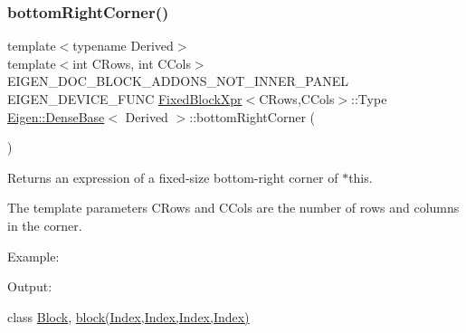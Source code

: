 \subsubsection{\texorpdfstring{bottomRightCorner()}{bottomRightCorner()}\hspace{0.1cm}{\footnotesize\ttfamily [2/3]}}
{\footnotesize\ttfamily template$<$typename Derived$>$ \\
template$<$int C\+Rows, int C\+Cols$>$ \\
E\+I\+G\+E\+N\+\_\+\+D\+O\+C\+\_\+\+B\+L\+O\+C\+K\+\_\+\+A\+D\+D\+O\+N\+S\+\_\+\+N\+O\+T\+\_\+\+I\+N\+N\+E\+R\+\_\+\+P\+A\+N\+EL E\+I\+G\+E\+N\+\_\+\+D\+E\+V\+I\+C\+E\+\_\+\+F\+U\+NC \mbox{\hyperlink{struct_eigen_1_1_dense_base_1_1_fixed_block_xpr}{Fixed\+Block\+Xpr}}$<$C\+Rows,C\+Cols$>$\+::Type \mbox{\hyperlink{class_eigen_1_1_dense_base}{Eigen\+::\+Dense\+Base}}$<$ Derived $>$\+::bottom\+Right\+Corner (\begin{DoxyParamCaption}{ }\end{DoxyParamCaption})\hspace{0.3cm}{\ttfamily [inline]}}

\begin{DoxyReturn}{Returns}
an expression of a fixed-\/size bottom-\/right corner of $\ast$this.
\end{DoxyReturn}
The template parameters C\+Rows and C\+Cols are the number of rows and columns in the corner.

Example\+: 
\begin{DoxyCodeInclude}{0}
\end{DoxyCodeInclude}
 Output\+: 
\begin{DoxyVerbInclude}
\end{DoxyVerbInclude}
 class \mbox{\hyperlink{class_eigen_1_1_block}{Block}}, \mbox{\hyperlink{class_eigen_1_1_dense_base_ab8e42e67c5cfd5fa13e684642f0f65bf}{block(\+Index,\+Index,\+Index,\+Index)}} \mbox{\label{class_eigen_1_1_dense_base_af60fcba2704ae771c148de156cf2c96b}} 
